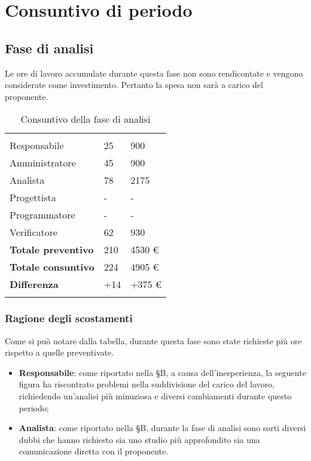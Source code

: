 \section{Consuntivo di periodo}


\subsection{Fase di analisi}

Le ore di lavoro accumulate durante questa fase non sono rendicontate e vengono considerate come investimento. Pertanto la spesa non sarà a carico del proponente.

{
\setlength\arrayrulewidth{1pt}
\begin{longtable}{ C{4cm} C{3cm} C{3.5cm}} 
 	 &
 	 &
 	 \\
 	
 	Responsabile & 25  & 900 \\
 	Amministratore & 45 & 900\\
 	Analista & 78  & 2175 \\
 	Progettista & - & -\\
 	Programmatore & - & -\\
 	Verificatore & 62 & 930\\
 	
	\hline 	
 	
 	\textbf{Totale preventivo} &
	210 &
 	4530 € \\		
 	
 	\textbf{Totale consuntivo} &
	224 &
 	4905 € \\	
 	
 	\textbf{Differenza} &
	+14 &
 	+375 € \\	
 	
 	\caption{Consuntivo della fase di analisi}
\end{longtable}
}

\subsubsection{Ragione degli scostamenti}
Come si può notare dalla tabella, durante questa fase sono state richieste più ore rispetto a quelle preventivate.
\begin{itemize}
\item \textbf{Responsabile}: come riportato nella \S B, a causa dell'inesperienza, la seguente figura ha riscontrato problemi nella suddivisione del carico del lavoro, richiedendo un'analisi più minuziosa e diversi cambiamenti durante questo periodo;
\item \textbf{Analista}: come riportato nella \S B, durante la fase di analisi sono sorti diversi dubbi che hanno richiesto sia uno studio più approfondito sia una comunicazione diretta con il proponente.
\end{itemize}

